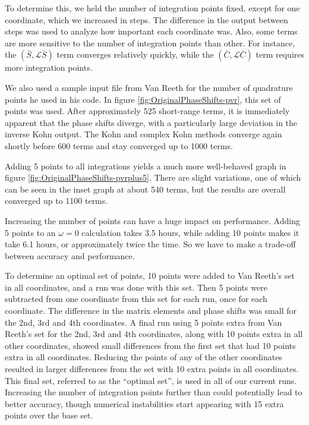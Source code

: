 \documentclass[Dissertation.tex]{subfiles}
\begin{document}
To determine this, we held the number of integration points fixed, except for one coordinate, which we increased in steps. The difference in the output between steps was used to analyze how important each coordinate was. Also, some terms are more sensitive to the number of integration points than other. For instance, the $(\bar{S},\mathcal{L} \bar{S})$ term converges relatively quickly, while the $(\bar{C},\mathcal{L} \bar{C})$ term requires more integration points.

We also used a sample input file from Van Reeth for the number of quadrature points he used in his code. In figure \ref{fig:OriginalPhaseShifts-pvr}, this set of points was used. After approximately 525 short-range terms, it is immediately apparent that the phase shifts diverge, with a particularly large deviation in the inverse Kohn output. The Kohn and complex Kohn methods converge again shortly before 600 terms and stay converged up to 1000 terms.

Adding 5 points to all integrations yields a much more well-behaved graph in figure \ref{fig:OriginalPhaseShifts-pvrplus5}. There are slight variations, one of which can be seen in the inset graph at about 540 terms, but the results are overall converged up to 1100 terms.

Increasing the number of points can have a huge impact on performance. Adding 5 points to an $\omega = 0$ calculation takes 3.5 hours, while adding 10 points makes it take 6.1 hours, or approximately twice the time. So we have to make a trade-off between accuracy and performance.

To determine an optimal set of points, 10 points were added to Van Reeth's set in all coordinates, and a run was done with this set. Then 5 points were subtracted from one coordinate from this set for each run, once for each coordinate. The difference in the matrix elements and phase shifts was small for the 2nd, 3rd and 4th coordinates. A final run using 5 points extra from Van Reeth's set for the 2nd, 3rd and 4th coordinates, along with 10 points extra in all other coordinates, showed small differences from the first set that had 10 points extra in all coordinates. Reducing the points of any of the other coordinates resulted in larger differences from the set with 10 extra points in all coordinates. This final set, referred to as the ``optimal set'', is used in all of our current runs. Increasing the number of integration points further than could potentially lead to better accuracy, though numerical instabilities start appearing with 15 extra points over the base set.
\end{document}
